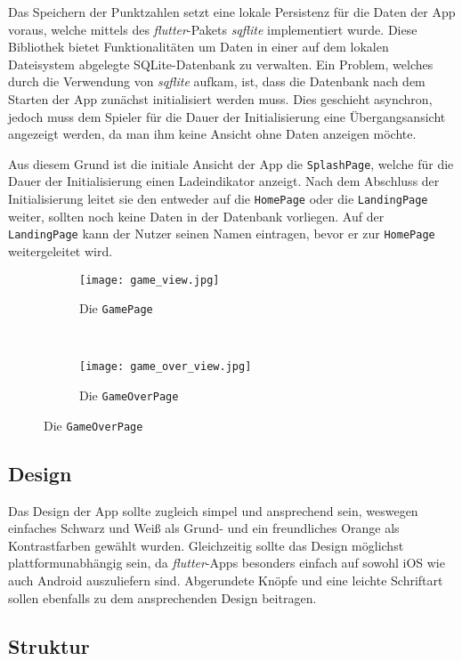 Das Speichern der Punktzahlen setzt eine lokale Persistenz für die Daten der App voraus, welche mittels des \emph{flutter}-Pakets \emph{sqflite} implementiert wurde.
Diese Bibliothek bietet Funktionalitäten um Daten in einer auf dem lokalen Dateisystem abgelegte SQLite-Datenbank zu verwalten.
Ein Problem, welches durch die Verwendung von \emph{sqflite} aufkam, ist, dass die Datenbank nach dem Starten der App zunächst initialisiert werden muss.
Dies geschieht asynchron, jedoch muss dem Spieler für die Dauer der Initialisierung eine Übergangsansicht angezeigt werden, da man ihm keine Ansicht ohne Daten anzeigen möchte.

Aus diesem Grund ist die initiale Ansicht der App die \texttt{SplashPage}, welche für die Dauer der Initialisierung einen Ladeindikator anzeigt.
Nach dem Abschluss der Initialisierung leitet sie den entweder auf die \texttt{HomePage} oder die \texttt{LandingPage} weiter, sollten noch keine Daten in der Datenbank vorliegen.
Auf der \texttt{LandingPage} kann der Nutzer seinen Namen eintragen, bevor er zur \texttt{HomePage} weitergeleitet wird.

\begin{figure}[h]
  \centering
  \begin{subfigure}[b]{0.4\textwidth}
    \texttt{[image: game\_view.jpg]}
    \caption{Die \texttt{GamePage}}
  \end{subfigure}
  ~
  \begin{subfigure}[b]{0.4\textwidth}
    \texttt{[image: game\_over\_view.jpg]}
    \caption{Die \texttt{GameOverPage}}
  \end{subfigure}
\end{figure}

\subsection{Design}

Das Design der App sollte zugleich simpel und ansprechend sein, weswegen einfaches Schwarz und Weiß als Grund- und ein freundliches Orange als Kontrastfarben gewählt wurden.
Gleichzeitig sollte das Design möglichst plattformunabhängig sein, da \emph{flutter}-Apps besonders einfach auf sowohl iOS wie auch Android auszuliefern sind.
Abgerundete Knöpfe und eine leichte Schriftart sollen ebenfalls zu dem ansprechenden Design beitragen.

\subsection{Struktur}

